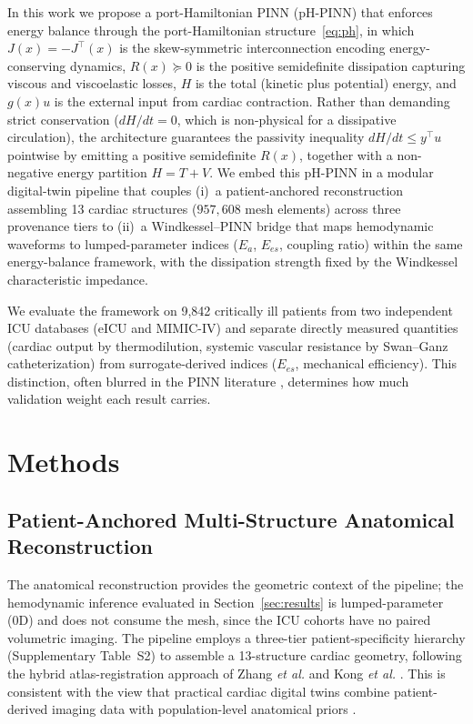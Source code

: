 \documentclass[journal]{IEEEtran}
\begin{document}
In this work we propose a port-Hamiltonian PINN (pH-PINN) that enforces energy balance through the port-Hamiltonian structure~\eqref{eq:ph}, in which $J(x)=-J^{\top}(x)$ is the skew-symmetric interconnection encoding energy-conserving dynamics, $R(x)\succeq 0$ is the positive semidefinite dissipation capturing viscous and viscoelastic losses, $H$ is the total (kinetic plus potential) energy, and $g(x)u$ is the external input from cardiac contraction. Rather than demanding strict conservation ($dH/dt=0$, which is non-physical for a dissipative circulation), the architecture guarantees the passivity inequality $dH/dt\le y^{\top}u$ pointwise by emitting a positive semidefinite $R(x)$, together with a non-negative energy partition $H=T+V$. We embed this pH-PINN in a modular digital-twin pipeline that couples (i)~a patient-anchored reconstruction assembling 13 cardiac structures ($957{,}608$ mesh elements) across three provenance tiers to (ii)~a Windkessel--PINN bridge that maps hemodynamic waveforms to lumped-parameter indices ($E_a$, $E_{es}$, coupling ratio) within the same energy-balance framework, with the dissipation strength fixed by the Windkessel characteristic impedance.

We evaluate the framework on 9{,}842 critically ill patients from two independent ICU databases (eICU and MIMIC-IV) and separate directly measured quantities (cardiac output by thermodilution, systemic vascular resistance by Swan--Ganz catheterization) from surrogate-derived indices ($E_{es}$, mechanical efficiency). This distinction, often blurred in the PINN literature \cite{karniadakis2021,kissas2020}, determines how much validation weight each result carries.


\section{Methods}\label{sec:methods}

\subsection{Patient-Anchored Multi-Structure Anatomical Reconstruction}\label{sec:anat}
The anatomical reconstruction provides the geometric context of the pipeline; the hemodynamic inference evaluated in Section~\ref{sec:results} is lumped-parameter (0D) and does not consume the mesh, since the ICU cohorts have no paired volumetric imaging. The pipeline employs a three-tier patient-specificity hierarchy (Supplementary Table~S2) to assemble a 13-structure cardiac geometry, following the hybrid atlas-registration approach of Zhang \emph{et al.} \cite{zhang2012} and Kong \emph{et al.} \cite{kong2023}. This is consistent with the view that practical cardiac digital twins combine patient-derived imaging data with population-level anatomical priors \cite{corral2020,rodero2021,hoogendoorn2013}.
\end{document}
